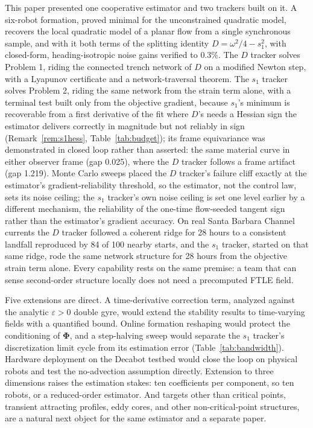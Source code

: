 \documentclass[lettersize,journal]{IEEEtran}
\begin{document}
This paper presented one cooperative estimator and two trackers built
on it. A six-robot formation, proved minimal for the unconstrained
quadratic model, recovers the local
quadratic model of a planar flow from a single synchronous sample, and
with it both terms of the splitting identity $D = \omega^2/4 - s_1^2$,
with closed-form, heading-isotropic noise gains verified to $0.3\%$.
The $D$ tracker solves Problem 1, riding the connected trench network of
$D$ on a modified Newton step, with a Lyapunov certificate and a
network-traversal theorem. The $s_1$
tracker solves Problem 2, riding the same network from the strain term
alone, with a terminal test built only from the objective gradient,
because $s_1$'s minimum is recoverable from a first derivative of the
fit where $D$'s needs a Hessian sign the estimator delivers correctly
in magnitude but not reliably in sign (Remark~\ref{rem:s1hess},
Table~\ref{tab:budget}); its frame
equivariance was demonstrated in closed loop rather than asserted: the
same material curve in either observer frame (gap 0.025), where the $D$
tracker follows a frame artifact (gap 1.219). Monte Carlo sweeps placed
the $D$ tracker's failure cliff exactly at the estimator's
gradient-reliability threshold, so the estimator, not the control law,
sets its noise ceiling; the $s_1$ tracker's own noise ceiling is set
one level earlier by a different mechanism, the reliability of the
one-time flow-seeded tangent sign rather than the estimator's gradient
accuracy. On
real Santa Barbara Channel currents the $D$ tracker followed a coherent
ridge for 28 hours to a consistent landfall reproduced by 84 of 100
nearby starts, and the $s_1$ tracker, started on that same ridge, rode
the same network structure for 28 hours from the objective strain term
alone. Every capability rests on the same premise: a team that can
sense second-order structure locally does not need a precomputed FTLE
field.

Five extensions are direct. A time-derivative correction term,
analyzed against the analytic $\varepsilon > 0$ double gyre, would
extend the stability results to time-varying fields with a quantified
bound. Online formation reshaping would protect the conditioning of
$\boldsymbol{\Phi}$, and a step-halving sweep would separate the $s_1$
tracker's discretization limit cycle from its estimation error
(Table~\ref{tab:bandwidth}). Hardware deployment on the Decabot testbed would
close the loop on physical robots and test the no-advection assumption
directly. Extension to three dimensions raises the estimation stakes:
ten coefficients per component, so ten robots, or a reduced-order
estimator. And targets other than critical points, transient attracting
profiles, eddy cores, and other non-critical-point structures, are a
natural next object for the same estimator and a separate paper.
\end{document}
